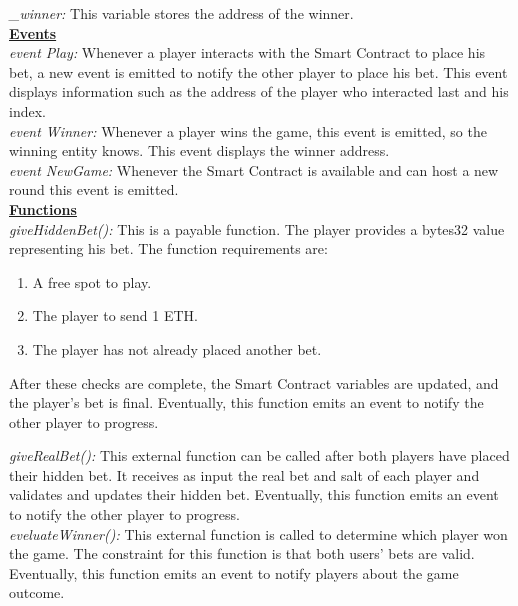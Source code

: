 \documentclass[12pt,a4paper]{article}
\begin{document}
\emph{\_winner:} This variable stores the address of the winner.\\


\textbf{\underline{Events}} \\

\emph{event Play:} Whenever a player interacts with the Smart Contract to place his bet, a new event is emitted
to notify the other player to place his bet. This event displays information such as the address of the player
who interacted last and his index.\\

\emph{event Winner:} Whenever a player wins the game, this event is emitted, so the winning entity knows. This event displays the winner address.\\

\emph{event NewGame:} Whenever the Smart Contract is available and can host a new round this event is emitted.\\


\textbf{\underline{Functions}} \\

\emph{giveHiddenBet():} This is a payable function. The player provides a bytes32 value representing his bet. The function requirements are:
\begin{enumerate}
    \item A free spot to play.
    \item The player to send 1 ETH.
    \item The player has not already placed another bet.
\end{enumerate}

After these checks are complete, the Smart Contract variables are updated, and the player’s bet is final. Eventually, this function emits an event to notify the other player to progress.

\emph{giveRealBet():} This external function can be called after both players have placed their hidden bet.
It receives as input the real bet and salt of each player and validates and updates their hidden bet.
Eventually, this function emits an event to notify the other player to progress.\\

\emph{eveluateWinner():} This external function is called to determine which player won the game.
The constraint for this function is that both users' bets are valid.
Eventually, this function emits an event to notify players about the game outcome.\\
\end{document}
